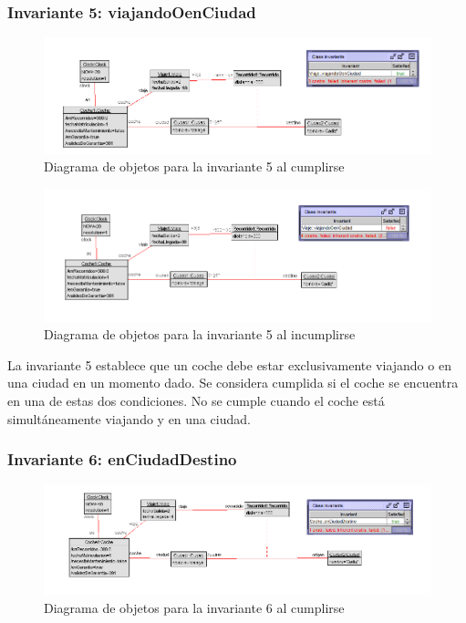 \documentclass[12pt.a4paper]{article}
\begin{document}
\subsubsection{Invariante 5: viajandoOenCiudad}

\vspace{1.0 cm}
\begin{figure}[H]
     \includegraphics[width=1\linewidth]{Soils/5.png}
     \caption{Diagrama de objetos para la invariante 5 al cumplirse}
\end{figure}

\begin{figure}[H]
     \includegraphics[width=1\linewidth]{Soils/5_v2.png}
     \caption{Diagrama de objetos para la invariante 5 al incumplirse}
\end{figure}

La invariante 5 establece que un coche debe estar exclusivamente viajando o en una ciudad en un momento dado. Se considera cumplida si el coche se encuentra en una de estas dos condiciones. No se cumple cuando el coche está simultáneamente viajando y en una ciudad.

\subsubsection{Invariante 6: enCiudadDestino}
    \begin{figure}[H]
         \centering
         \includegraphics[width=1\linewidth]{Soils/6.png}
         \caption{Diagrama de objetos para la invariante 6 al cumplirse}
    \end{figure}
\end{document}
